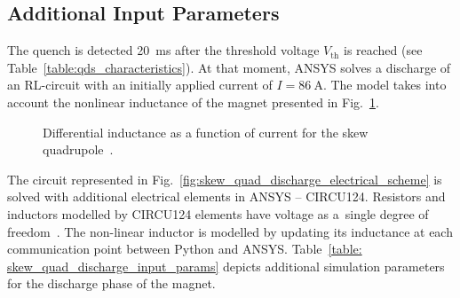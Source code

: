 
\subsection{Additional Input Parameters}

The quench is detected 20~ms after the threshold voltage $V_\text{th}$ is reached (see Table~\ref{table:qds_characteristics}). At that moment, ANSYS solves a discharge of an RL-circuit with an initially applied current of $I=86~\text{A}$. The model takes into account the nonlinear inductance of  the magnet presented in Fig.~\ref{fig:differential_inductance}.

\begin{figure}[H]
    \centering
    \caption{Differential inductance as a function of current for the skew quadrupole~\cite{marco_prioli_mails}.}
    \label{fig:differential_inductance}
\end{figure}

The circuit represented in Fig.~\ref{fig:skew_quad_discharge_electrical_scheme} is solved with additional electrical elements in ANSYS -- CIRCU124. Resistors and inductors modelled by CIRCU124 elements have voltage as a~single degree of freedom~\cite{ansys_element_manual}. The non-linear inductor is modelled by updating its inductance at each communication point between Python and ANSYS. Table~\ref{table: skew_quad_discharge_input_params} depicts additional simulation parameters for the discharge phase of the magnet. 

